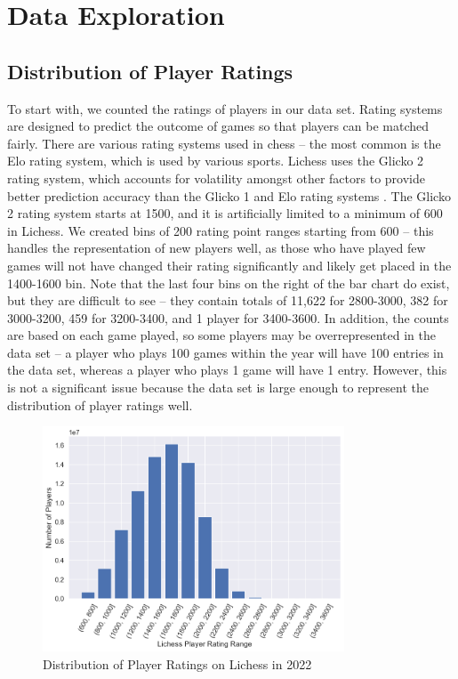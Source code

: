 \documentclass[a4paper, 11pt]{article}
\begin{document}
\section{Data Exploration}

\subsection{Distribution of Player Ratings}
To start with, we counted the ratings of players in our data set. Rating systems are designed to predict the outcome of games so that players can be matched fairly. There are various rating systems used in chess -- the most common is the Elo rating system, which is used by various sports. Lichess uses the Glicko 2 rating system, which accounts for volatility amongst other factors to provide better prediction accuracy than the Glicko 1 and Elo rating systems \cite{chessRatingSystems, DeloitteFIDEChessRatingChallenge}. The Glicko 2 rating system starts at 1500, and it is artificially limited to a minimum of 600 in Lichess. We created bins of 200 rating point ranges starting from 600 -- this handles the representation of new players well, as those who have played few games will not have changed their rating significantly and likely get placed in the 1400-1600 bin. Note that the last four bins on the right of the bar chart do exist, but they are difficult to see -- they contain totals of 11,622 for 2800-3000, 382 for 3000-3200, 459 for 3200-3400, and 1 player for 3400-3600. In addition, the counts are based on each game played, so some players may be overrepresented in the data set -- a player who plays 100 games within the year will have 100 entries in the data set, whereas a player who plays 1 game will have 1 entry. However, this is not a significant issue because the data set is large enough to represent the distribution of player ratings well.

\begin{figure}[H]
    \centering
    \caption{Distribution of Player Ratings on Lichess in 2022}
    \label{fig:distributionOfPlayerRatings}
    \includegraphics[width=0.8\textwidth]{Distribution of Player Ratings.png}
\end{figure}
\end{document}
